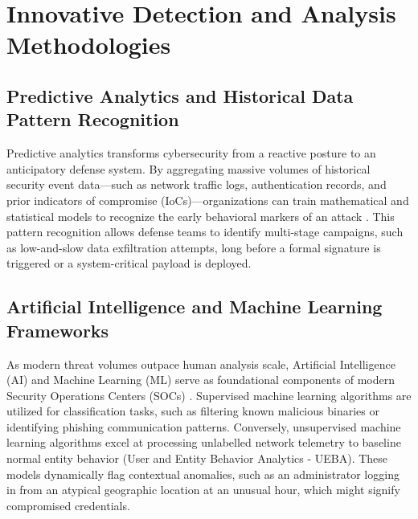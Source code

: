 \documentclass[11pt,a4paper]{article}
\begin{document}
\section{Innovative Detection and Analysis Methodologies}

\subsection{Predictive Analytics and Historical Data Pattern Recognition}
Predictive analytics transforms cybersecurity from a reactive posture to an anticipatory defense system. By aggregating massive volumes of historical security event data—such as network traffic logs, authentication records, and prior indicators of compromise (IoCs)—organizations can train mathematical and statistical models to recognize the early behavioral markers of an attack \cite{b4}. This pattern recognition allows defense teams to identify multi-stage campaigns, such as low-and-slow data exfiltration attempts, long before a formal signature is triggered or a system-critical payload is deployed.

\subsection{Artificial Intelligence and Machine Learning Frameworks}
As modern threat volumes outpace human analysis scale, Artificial Intelligence (AI) and Machine Learning (ML) serve as foundational components of modern Security Operations Centers (SOCs) \cite{b6}. Supervised machine learning algorithms are utilized for classification tasks, such as filtering known malicious binaries or identifying phishing communication patterns. Conversely, unsupervised machine learning algorithms excel at processing unlabelled network telemetry to baseline normal entity behavior (User and Entity Behavior Analytics - UEBA). These models dynamically flag contextual anomalies, such as an administrator logging in from an atypical geographic location at an unusual hour, which might signify compromised credentials.
\end{document}
